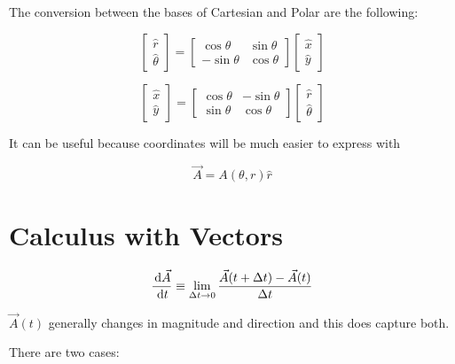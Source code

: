 The conversion between the bases of Cartesian and Polar are the following:

\begin{equation} \label{eq:polar-cartesian-basis}
	\begin{bmatrix}
		\hat r\\\hat \theta
	\end{bmatrix} = \begin{bmatrix}
		\cos\theta & \sin\theta\\
		-\sin\theta & \cos\theta
	\end{bmatrix} \begin{bmatrix}
		\hat x\\\hat y
	\end{bmatrix}
\end{equation}

\begin{equation}
	\begin{bmatrix}
		\hat x\\\hat y
	\end{bmatrix} = \begin{bmatrix}
		\cos\theta & -\sin\theta\\
		\sin\theta & \cos\theta
	\end{bmatrix} \begin{bmatrix}
		\hat r\\\hat \theta
	\end{bmatrix}
\end{equation}

\begin{remark}
	It can be useful because coordinates will be much easier to express with

	\begin{equation}
		\vec A = A(\theta, r) \hat r
	\end{equation}
\end{remark}

\section{Calculus with Vectors}

\begin{equation}
	\frac{\D \vec A}{\D t} \equiv \lim_{\Delta t \to 0} \frac{\vec A(t + \Delta t) - \vec A(t)}{\Delta t}
\end{equation}

$\vec A(t)$ generally changes in magnitude and direction and this does capture both.

There are two cases:

